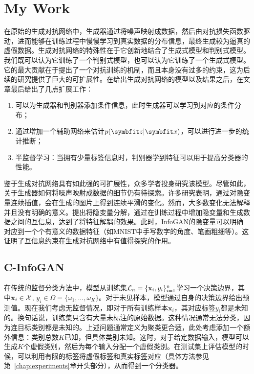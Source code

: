 \chapter{My Work}\label{chap:c-infogan}
在原始的生成对抗网络中，生成器通过将噪声映射成数据，然后由对抗损失函数驱动，进而能够在训练过程中慢慢学习到真实数据的分布信息，最终生成较为逼真的虚假数据。生成对抗网络的特殊性在于它创新地结合了生成式模型和判别式模型。我们既可以认为它训练了一个判别式模型，也可以认为它训练了一个生成式模型。它的最大贡献在于提出了一个对抗训练的机制，而且本身没有过多的约束，这为后续的研究提供了巨大的可扩展性。\citet{goodfellow2014generative}在给出生成对抗网络的模型以及结果之后，在文章最后给出了几点扩展工作：
\begin{enumerate}
  \item 可以为生成器和判别器添加条件信息，此时生成器可以学习到对应的条件分布；
  \item 通过增加一个辅助网络来估计$p(\bd{z}|\bd{x})$，可以进行进一步的统计推断；
  \item 半监督学习：当拥有少量标签信息时，判别器学到特征可以用于提高分类器的性能。
\end{enumerate}

鉴于生成对抗网络具有如此强的可扩展性，众多学者投身研究该模型\citep{mirza2014conditional,radford2015unsupervised,chen2016infogan,chongxuan2017triple,mao2017least}。尽管如此，关于生成器如何将噪声映射成数据的细节仍有待探索。许多研究表明，通过对隐变量连续插值，会在生成的图片上得到连续平滑的变化\citep{radford2015unsupervised,chen2016infogan,dumoulin2016adversarially,miyato2018cgans}。然而，大多数变化无法解释并且没有明确的意义。\citet{chen2016infogan}提出将隐变量分解，通过在训练过程中增加隐变量和生成数据之间的互信息，达到了将特征解耦的效果。此时，InfoGAN的隐变量可以明确对应到一个个有意义的数据特征（如MNIST中手写数字的角度、笔画粗细等）。这证明了互信息约束在生成对抗网络中有值得探究的作用。

\section{C-InfoGAN}\label{sec:c-infogan}
在传统的监督分类方法中，模型从训练集$\mathcal{L}_n = \{\mathbf{x}_i, y_i\}_{i=1}^n$学习一个决策边界，其中$\mathbf{x}_i \in \mathcal{X}$, $y_i \in \Omega = \{\omega_1, \dots, \omega_K\}$。对于未见样本，模型通过自身的决策边界给出预测值。现在我们考虑无监督情况，即对于所有训练样本$\mathbf{x}_i$，其对应标签$y_i$都是未知的。换句话说，训练集只含有大量未标注的原始数据。这种情况通常无法分类，因为连目标类别都是未知的。上述问题通常定义为聚类更合适，此处考虑添加一个额外信息：类别总数$K$已知，但具体类别未知。这时，对于给定数据输入，模型可以生成$K$个虚假类别，然后为每个输入分配一个虚假类别。在测试集上评估模型的时候，可以利用有限的标签将虚假标签和真实标签对应（具体方法参见第~\ref{chap:experiments}章开头部分），从而得到一个分类器。

